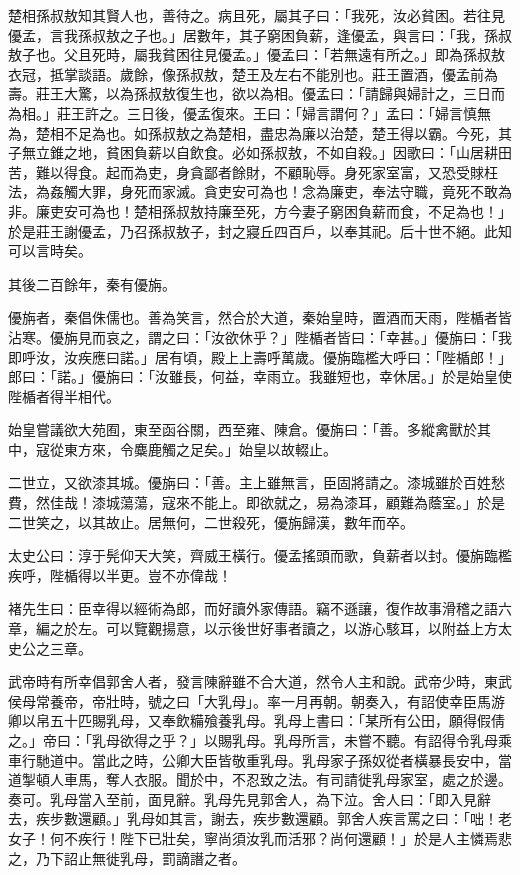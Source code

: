 \begin{pinyinscope}
楚相孫叔敖知其賢人也，善待之。病且死，屬其子曰：「我死，汝必貧困。若往見優孟，言我孫叔敖之子也。」居數年，其子窮困負薪，逢優孟，與言曰：「我，孫叔敖子也。父且死時，屬我貧困往見優孟。」優孟曰：「若無遠有所之。」即為孫叔敖衣冠，抵掌談語。歲餘，像孫叔敖，楚王及左右不能別也。莊王置酒，優孟前為壽。莊王大驚，以為孫叔敖復生也，欲以為相。優孟曰：「請歸與婦計之，三日而為相。」莊王許之。三日後，優孟復來。王曰：「婦言謂何？」孟曰：「婦言慎無為，楚相不足為也。如孫叔敖之為楚相，盡忠為廉以治楚，楚王得以霸。今死，其子無立錐之地，貧困負薪以自飲食。必如孫叔敖，不如自殺。」因歌曰：「山居耕田苦，難以得食。起而為吏，身貪鄙者餘財，不顧恥辱。身死家室富，又恐受賕枉法，為姦觸大罪，身死而家滅。貪吏安可為也！念為廉吏，奉法守職，竟死不敢為非。廉吏安可為也！楚相孫叔敖持廉至死，方今妻子窮困負薪而食，不足為也！」於是莊王謝優孟，乃召孫叔敖子，封之寢丘四百戶，以奉其祀。后十世不絕。此知可以言時矣。

其後二百餘年，秦有優旃。

優旃者，秦倡侏儒也。善為笑言，然合於大道，秦始皇時，置酒而天雨，陛楯者皆沾寒。優旃見而哀之，謂之曰：「汝欲休乎？」陛楯者皆曰：「幸甚。」優旃曰：「我即呼汝，汝疾應曰諾。」居有頃，殿上上壽呼萬歲。優旃臨檻大呼曰：「陛楯郎！」郎曰：「諾。」優旃曰：「汝雖長，何益，幸雨立。我雖短也，幸休居。」於是始皇使陛楯者得半相代。

始皇嘗議欲大苑囿，東至函谷關，西至雍、陳倉。優旃曰：「善。多縱禽獸於其中，寇從東方來，令麋鹿觸之足矣。」始皇以故輟止。

二世立，又欲漆其城。優旃曰：「善。主上雖無言，臣固將請之。漆城雖於百姓愁費，然佳哉！漆城蕩蕩，寇來不能上。即欲就之，易為漆耳，顧難為蔭室。」於是二世笑之，以其故止。居無何，二世殺死，優旃歸漢，數年而卒。

太史公曰：淳于髡仰天大笑，齊威王橫行。優孟搖頭而歌，負薪者以封。優旃臨檻疾呼，陛楯得以半更。豈不亦偉哉！

褚先生曰：臣幸得以經術為郎，而好讀外家傳語。竊不遜讓，復作故事滑稽之語六章，編之於左。可以覽觀揚意，以示後世好事者讀之，以游心駭耳，以附益上方太史公之三章。

武帝時有所幸倡郭舍人者，發言陳辭雖不合大道，然令人主和說。武帝少時，東武侯母常養帝，帝壯時，號之曰「大乳母」。率一月再朝。朝奏入，有詔使幸臣馬游卿以帛五十匹賜乳母，又奉飲糒飱養乳母。乳母上書曰：「某所有公田，願得假倩之。」帝曰：「乳母欲得之乎？」以賜乳母。乳母所言，未嘗不聽。有詔得令乳母乘車行馳道中。當此之時，公卿大臣皆敬重乳母。乳母家子孫奴從者橫暴長安中，當道掣頓人車馬，奪人衣服。聞於中，不忍致之法。有司請徙乳母家室，處之於邊。奏可。乳母當入至前，面見辭。乳母先見郭舍人，為下泣。舍人曰：「即入見辭去，疾步數還顧。」乳母如其言，謝去，疾步數還顧。郭舍人疾言罵之曰：「咄！老女子！何不疾行！陛下已壯矣，寧尚須汝乳而活邪？尚何還顧！」於是人主憐焉悲之，乃下詔止無徙乳母，罰謫譖之者。


\end{pinyinscope}
